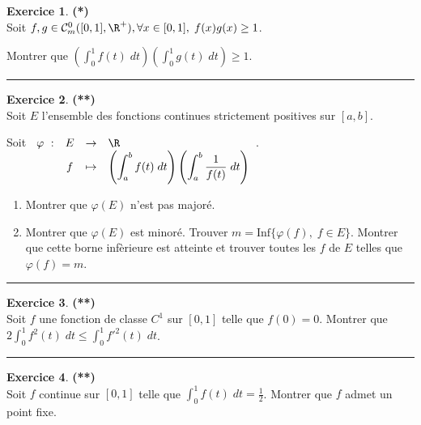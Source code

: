 \documentclass[a4paper,11pt]{article}
\theoremstyle{definition}
\newtheorem{exo}{Exercice} %
\begin{document}
\begin{minipage}{1\linewidth}\begin{minipage}[t]{0.48\linewidth}\raggedright
		

\begin{exo}\textbf{(*)}\quad\\[0.2cm]
	Soit $f,g\in\mathcal{C}^0_m([0,1],\R^+), \forall x\in[0,1],\;f(x)g(x)\geq1$. 
	
	Montrer que $\left(\int_{0}^{1}f(t)\;dt\right)\left(\int_{0}^{1}g(t)\;dt\right)\geq1$.
	
	\centering\rule{1\linewidth}{0.6pt}\end{exo}

\begin{exo}\textbf{(**)}\quad\\[0.2cm]
Soit $E$ l'ensemble des fonctions continues strictement positives sur $[a,b]$.

Soit $\begin{array}[t]{cccl}
\varphi~:&E&\rightarrow&\R\\
&f&\mapsto&\displaystyle\left(\int_{a}^{b}f(t)\;dt\right)\left(\int_{a}^{b}\frac{1}{f(t)}\;dt\right)
\end{array}$.

\begin{enumerate}
	\item  Montrer que $\varphi(E)$ n'est pas majoré.
	\item  Montrer que $\varphi(E)$ est minoré. Trouver $m=\mbox{Inf}\{\varphi(f),\;f\in E\}$. Montrer que cette borne infèrieure est atteinte et trouver toutes les $f$ de $E$ telles que $\varphi(f)=m$.
\end{enumerate}	
	
	
	\centering\rule{1\linewidth}{0.6pt}\end{exo}



\begin{exo}\textbf{(**)}\quad\\[0.2cm]
Soit $f$ une fonction de classe $C^1$ sur $[0,1]$ telle que $f(0)=0$. Montrer que $\displaystyle2\int_{0}^{1}f^2(t)\;dt\leq\int_{0}^{1}{f'}^2(t)\;dt$. 
	
	\centering\rule{1\linewidth}{0.6pt}\end{exo}


\begin{exo}\textbf{(**)}\quad\\[0.2cm]
	Soit $f$ continue sur $[0,1]$ telle que $\displaystyle\int_{0}^{1}f(t)\;dt=\frac{1}{2}$. Montrer que $f$ admet un point fixe.
	

\end{exo}
\end{minipage}
\end{minipage}
\end{document}
